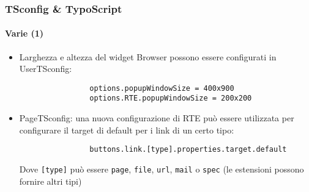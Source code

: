 \begin{frame}[fragile]
	\frametitle{TSconfig \& TypoScript}
	\framesubtitle{Varie (1)}

	\begin{itemize}
		\item Larghezza e altezza del widget Browser possono essere configurati in UserTSconfig:

			\begin{lstlisting}
				options.popupWindowSize = 400x900
				options.RTE.popupWindowSize = 200x200
			\end{lstlisting}


		\item PageTSconfig: una nuova configurazione di RTE può essere utilizzata per configurare il target di default per i link di un certo tipo:

			\begin{lstlisting}
				buttons.link.[type].properties.target.default
			\end{lstlisting}

			Dove \texttt{[type]} può essere \texttt{page}, \texttt{file}, \texttt{url}, \texttt{mail} o \texttt{spec}\newline
			(le estensioni possono fornire altri tipi)

	\end{itemize}

\end{frame}


